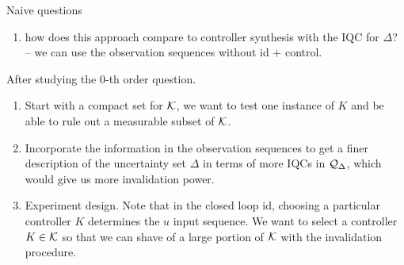 \documentclass[11pt, onecolumn]{article}
\begin{document}
Naive questions
\begin{enumerate}
\item how does this approach compare to controller synthesis with the IQC for $\Delta$? -- we can
  use the observation sequences without id + control.
\end{enumerate}


After studying the 0-th order question.
\begin{enumerate}
\item Start with a compact set for $\mathcal K$, we want to test one instance of $K$ and be able to rule
  out a measurable subset of $\mathcal K$.
\item Incorporate the information in the observation sequences to get a finer description of the
  uncertainty set $\Delta$ in terms of more IQCs in $\mathcal Q_{\Delta}$, which would give us more
  invalidation power.
\item Experiment design. Note that in the closed loop id, choosing a particular controller $K$
  determines the $u$ input sequence. We want to select a controller $K\in \mathcal K$ so that we can
  shave of a large portion of $\mathcal K$ with the invalidation procedure.
\end{enumerate}








\end{document}
